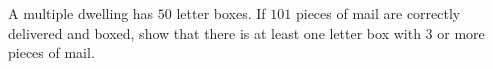 A multiple dwelling has $50$ letter boxes. If $101$ pieces of mail are correctly delivered and boxed, show that there is at least one letter box with $3$ or more pieces of mail.
